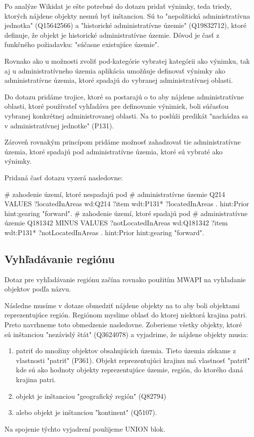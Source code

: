 Po analýze Wikidat je ešte potrebné do dotazu pridať výnimky, teda triedy, ktorých nájdene objekty nesmú byť inštanciou.
Sú to "nepolitická administratívna jednotka" (Q15642566) a "historické administratívne územie" (Q19832712), ktoré definuje, že objekt je historické administratívne
územie. Dôvod je časť z funkčného požiadavku: "súčasne existujúce územie".

Rovnako ako u možnosti zvoliť pod-kategórie vybratej kategórii ako výnimku, tak aj u administratívneho územia
aplikácia umožňuje definovať výnimky ako administratívne územia, ktoré spadajú do vybranej administratívnej oblasti.

Do dotazu pridáme trojice, ktoré sa postarajú o to aby nájdene administratívne oblasti, ktoré používateľ vyhľadáva
pre definovanie výnimiek, boli súčasťou vybranej
konkrétnej administrovanej oblasti. Na to poslúži predikát "nachádza sa v administratívnej jednotke" (P131).

Zároveň rovnakým princípom pridáme možnosť zahadzovať tie administratívne územia, ktoré spadajú pod administratívne územia, ktoré
sú vybraté ako výnimky.

Pridaná časť dotazu vyzerá nasledovne:
\begin{code}
      # zahodenie území, ktoré nespadajú pod
      # administratívne územie Q214
      VALUES ?locatedInAreas {wd:Q214  }
      ?item wdt:P131* ?locatedInAreas .
      hint:Prior hint:gearing "forward".
      # zahodenie území, ktoré spadajú pod
      # administratívne územie Q181342
      MINUS{
      VALUES ?notLocatedInAreas {wd:Q181342  }
      ?item wdt:P131* ?notLocatedInAreas .
      hint:Prior hint:gearing "forward".
      }
\end{code}

\subsection*{Vyhľadávanie regiónu }
Dotaz pre vyhľadávanie regiónu začína rovnako použitím MWAPI na vyhľadanie objektov podľa názvu.

Následne musíme v dotaze obmedziť nájdene objekty na to aby boli objektami reprezentujúce región.
Regiónom myslime oblasť do ktorej niektorá krajina patri. Preto navrhneme toto obmedzenie nasledovne.
Zoberieme všetky objekty, ktoré sú inštanciou "nezávislý štát" (Q3624078) a vyjadrime, že
nájdene objekty musia:
\begin{enumerate}
      \item patriť do množiny objektov obsahujúcich územia. Tieto územia získame z vlastnosti "patriť" (P361).
            Objekt reprezentujúci krajinu má vlastnosť "patriť" kde sú ako hodnoty objekty reprezentujúce územie, región, do ktorého daná krajina patri.
      \item objekt je inštanciou "geografický región" (Q82794)
      \item alebo objekt je inštanciou "kontinent" (Q5107).
\end{enumerate}
Na spojenie týchto vyjadrení použijeme UNION blok.

